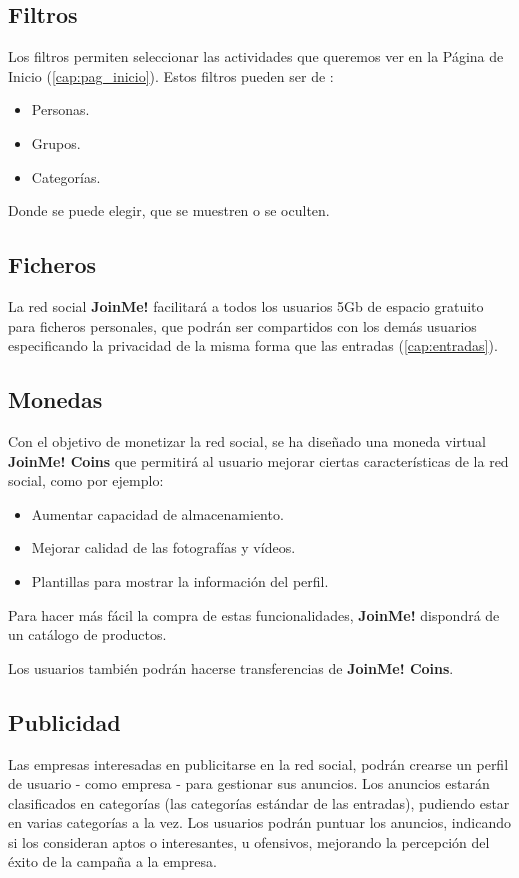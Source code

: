 \documentclass[12pt, a4paper, titlepage]{article}
\begin{document}
\subsection{Filtros}\label{cap:Filtros}

Los filtros permiten seleccionar las actividades que queremos ver en la Página de Inicio (\ref{cap:pag_inicio}). Estos filtros pueden ser de :
\begin{itemize}
\item Personas.
\item Grupos.
\item Categorías.
\end{itemize}
Donde se puede elegir, que se muestren o se oculten.

\subsection{Ficheros}

La red social \textbf{JoinMe!} facilitará a todos los usuarios 5Gb de espacio gratuito para ficheros personales, que podrán ser compartidos con los demás usuarios especificando la privacidad de la misma forma que las entradas (\ref{cap:entradas}).
\subsection{Monedas}

Con el objetivo de monetizar la red social, se ha diseñado una moneda virtual \textbf{JoinMe! Coins} que permitirá al usuario mejorar ciertas características de la red social, como por ejemplo:
\begin{itemize}
\item Aumentar capacidad de almacenamiento.
\item Mejorar calidad de las fotografías y vídeos.
\item Plantillas para mostrar la información del perfil.
\end{itemize}
Para hacer más fácil la compra de estas funcionalidades, \textbf{JoinMe!} dispondrá de un catálogo de productos.

Los usuarios también podrán hacerse transferencias de \textbf{JoinMe! Coins}.

\subsection{Publicidad}

Las empresas interesadas en publicitarse en la red social, podrán crearse un perfil de usuario - como empresa - para gestionar sus anuncios. 
Los anuncios estarán clasificados en categorías (las categorías  estándar de las entradas), pudiendo estar en varias categorías a la vez. Los usuarios podrán puntuar los anuncios, indicando si los consideran aptos o interesantes, u ofensivos, mejorando la percepción del éxito de la campaña a la empresa.
\end{document}

